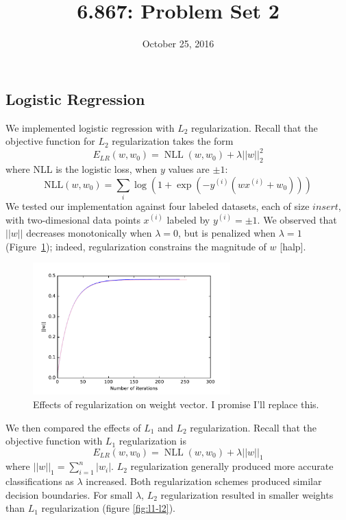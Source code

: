 \documentclass{article}
\title{6.867: Problem Set 2}
\date{October 25, 2016}
\DeclareMathOperator{\NLL}{NLL}
\newcommand{\sind}[1]{^{(#1)}}
\begin{document}
\maketitle

\begin{multicols}{2}


\section{Logistic Regression}
\label{sec:lr}

We implemented logistic regression with $L_2$ regularization.
Recall that the objective function for $L_2$ regularization takes the form
\begin{equation}
    E_{LR}(w, w_0) = \NLL(w, w_0) + \lambda ||w||_2^2
\end{equation}
where NLL is the logistic loss, when $y$ values are $\pm 1$:
\begin{equation}
    \text{NLL}(w, w_0) = \sum_i{\log(1+\exp(-y^{(i)}(wx^{(i)}+w_0)))}
\end{equation}
We tested our implementation against four labeled datasets,
each of size $insert$, %
with two-dimesional data points $x\sind{i}$ labeled by $y\sind{i} = \pm1$.
We observed that $||w||$ decreases monotonically when $\lambda=0$,  %
but is penalized when $\lambda=1$ (Figure~\ref{fig:weight-regularization});
indeed, regularization constrains the magnitude of $w$ [halp].  %

\begin{figure}
   \centering
   \includegraphics[width=3in]{img/1-1-weights.pdf}
   \caption{Effects of regularization on weight vector. I promise I'll replace this.}
   \label{fig:weight-regularization}
\end{figure}

We then compared the effects of $L_1$ and $L_2$ regularization.
Recall that the objective function with $L_1$ regularization is
\begin{equation}
    E_{LR}(w, w_0) = \NLL(w, w_0) + \lambda ||w||_1
\end{equation}
where $||w||_1 = \sum_{i=1}^n{|w_i|}$.
$L_2$ regularization generally produced
more accurate classifications as $\lambda$ increased.
Both regularization schemes produced similar decision boundaries.
For small $\lambda$,
$L_2$ regularization resulted in smaller weights
than $L_1$ regularization (figure \ref{fig:l1-l2}).


\end{multicols}
\end{document}
